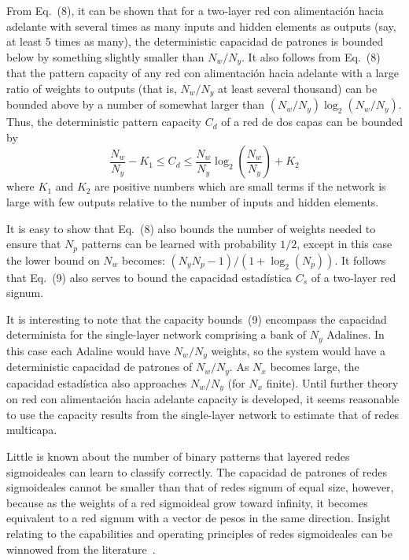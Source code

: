\documentclass[10pt,twocolumn]{article}
\begin{document}
From Eq.~(8), it can be shown that for a two-layer red con alimentación hacia adelante with
several times as many inputs and hidden elements as outputs (say, at least 5
times as many), the deterministic capacidad de patrones is bounded below by something
slightly smaller than $N_w/N_y$. It also follows from Eq.~(8) that the pattern
capacity of any red con alimentación hacia adelante with a large ratio of weights to outputs
(that is, $N_w/N_y$ at least several thousand) can be bounded above by a number of
somewhat larger than $(N_w/N_y)\log_2(N_w/N_y)$. Thus, the deterministic pattern
capacity $C_d$ of a red de dos capas can be bounded by
\begin{equation}
\frac{N_w}{N_y}-K_1 \le C_d \le \frac{N_w}{N_y}\log_2\!\left(\frac{N_w}{N_y}\right)+K_2 \tag{9}
\end{equation}
where $K_1$ and $K_2$ are positive numbers which are small terms if the network
is large with few outputs relative to the number of inputs and hidden elements.

It is easy to show that Eq.~(8) also bounds the number of weights needed to
ensure that $N_p$ patterns can be learned with probability $1/2$, except in this
case the lower bound on $N_w$ becomes: $(N_y N_p - 1)/(1 + \log_2(N_p))$. It
follows that Eq.~(9) also serves to bound the capacidad estadística $C_s$ of a
two-layer red signum.

It is interesting to note that the capacity bounds~(9) encompass the
capacidad determinista for the single-layer network comprising a bank of $N_y$
Adalines. In this case each Adaline would have $N_w/N_y$ weights, so the system
would have a deterministic capacidad de patrones of $N_w/N_y$. As $N_x$ becomes large,
the capacidad estadística also approaches $N_w/N_y$ (for $N_x$ finite). Until
further theory on red con alimentación hacia adelante capacity is developed, it seems reasonable
to use the capacity results from the single-layer network to estimate that of
redes multicapa.

Little is known about the number of binary patterns that layered redes sigmoideales
can learn to classify correctly. The capacidad de patrones of redes sigmoideales cannot
be smaller than that of redes signum of equal size, however, because as the
weights of a red sigmoideal grow toward infinity, it becomes equivalent to a
red signum with a vector de pesos in the same direction. Insight relating to
the capabilities and operating principles of redes sigmoideales can be winnowed
from the literature~\cite{lapedes,cybenko89,baumhaussler}.
\end{document}
